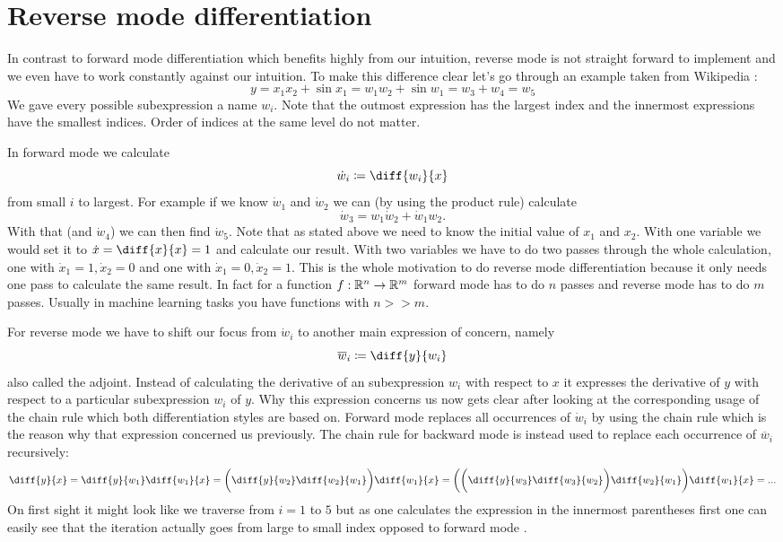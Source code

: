 \section{Reverse mode differentiation}

In contrast to forward mode differentiation which benefits highly from our intuition, reverse mode is not straight forward to implement and we even have to work constantly against our intuition. To make this difference clear let's go through an example taken from Wikipedia \cite{forwardAccumulationWiki}:
\newcommand{\yExampleDiff}{y = x_1x_2 + \sin{x_1} = w_1w_2 + \sin{w_1} = w_3 + w_4 = w_5}
\[ \yExampleDiff \]
We gave every possible subexpression a name $w_i$. Note that the outmost expression has the largest index and the innermost expressions have the smallest indices. Order of indices at the same level do not matter.

In forward mode we calculate 
\[ \dot w_i \coloneqq \diff{w_i}{x} \]
from small $i$ to largest. For example if we know $\dot w_1$ and $\dot w_2$ we can (by using the product rule) calculate 
\[ \dot w_3 = w_1 \dot w_2 + \dot w_1 w_2. \]
With that (and $\dot w_4$) we can then find $\dot w_5$. Note that as stated above we need to know the initial value of $x_1$ and $x_2$. With one variable we would set it to $\dot x = \diff{x}{x} = 1$ and calculate our result. With two variables we have to do two passes through the whole calculation, one with $\dot x_1 = 1, \dot x_2 = 0$ and one with $\dot x_1 = 0, \dot x_2 = 1$. This is the whole motivation to do reverse mode differentiation because it only needs one pass to calculate the same result. In fact for a function $f: \mathbb{R}^n \to \mathbb{R}^m$ forward mode has to do $n$ passes and reverse mode has to do $m$ passes. Usually in machine learning tasks you have functions with $n >\! \!> m$.

\newcommand{\overw}[1]{\overline{w}_#1}
\newcommand{\diffyw}[1]{\diff{y}{w_#1}}
For reverse mode we have to shift our focus from $\dot w_i$ to another main expression of concern, namely 
\[ \overw{i} \coloneqq \diffyw{i} \]
also called the adjoint. Instead of calculating the derivative of an subexpression $w_i$ with respect to $x$ it expresses the derivative of $y$ with respect to a particular subexpression $w_i$ of $y$. Why this expression concerns us now gets clear after looking at the corresponding usage of the chain rule  which both differentiation styles are based on. Forward mode replaces all occurrences of $\dot w_i$ by using the chain rule which is the reason why that expression concerned us previously. The chain rule for backward mode is instead used to replace each occurrence of $\overw{i}$ recursively:
\newcommand{\diffw}[2]{\diff{w_#1}{w_#2}}
\[ \diff{y}{x} = \diffyw{1}\diff{w_1}{x} = \bigg(\diffyw{2}\diffw{2}{1}\bigg)\diff{w_1}{x} = \bigg(\bigg(\diffyw{3}\diffw{3}{2}\bigg)\diffw{2}{1}\bigg)\diff{w_1}{x} = ... \]
On first sight it might look like we traverse from $i = 1$ to $5$ but as one calculates the expression in the innermost parentheses first one can easily see that the iteration actually goes from large to small index opposed to forward mode \todogrammar. 

